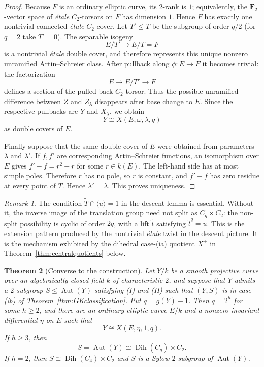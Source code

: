 \documentclass[11pt]{article}
\newtheorem{theorem}{Theorem}[section]
\theoremstyle{remark}
\newtheorem{remark}[theorem]{Remark}
\newcommand{\Aut}{\operatorname{Aut}}
\newcommand{\Dih}{\operatorname{Dih}}
\begin{document}
\begin{proof}
Because $F$ is an ordinary elliptic curve, its $2$-rank is $1$;
equivalently, the $\mathbf F_2$-vector space of \emph{\'etale} $C_2$-torsors on
$F$ has dimension $1$.  Hence $F$ has exactly one nontrivial connected
\emph{\'etale} $C_2$-cover.  Let
$T'\le T$ be the subgroup of order $q/2$ (for $q=2$ take $T'=0$).  The
separable isogeny
\[
        E/T'\longrightarrow E/T=F
\]
is a nontrivial \emph{\'etale} double cover, and therefore represents this unique
nonzero unramified Artin--Schreier class.  After pullback along
$\phi:E\to F$ it becomes trivial: the factorization
\[
        E\longrightarrow E/T'\longrightarrow F
\]
defines a section of the pulled-back $C_2$-torsor.  Thus the possible
unramified difference between $Z$ and $Z_\lambda$ disappears after base
change to $E$.  Since the respective pullbacks are $Y$ and $X_\lambda$,
we obtain
\[
        Y\cong X(E,\omega,\lambda,q)
\]
as double covers of $E$.

Finally suppose that the same double cover of $E$ were obtained from
parameters $\lambda$ and $\lambda'$.  If $f,f'$ are corresponding
Artin--Schreier functions, an isomorphism over $E$ gives
$f'-f=r^2+r$ for some $r\in k(E)$.  The left-hand side has at most
simple poles.  Therefore $r$ has no pole, so $r$ is constant, and
$f'-f$ has zero residue at every point of $T$.  Hence
$\lambda'=\lambda$.  This proves uniqueness.
\end{proof}

\begin{remark}\label{rem:descent-sharp}
The condition
$\widetilde T\cap\langle u\rangle=1$ in the descent lemma is essential.
Without it, the inverse image of the translation group need not split as
$C_q\times C_2$: the non-split possibility is cyclic of order $2q$, with
a lift $\widetilde t$ satisfying $\widetilde t^{q}=u$.  This is the
extension pattern produced by the nontrivial \emph{\'etale} twist in the
descent picture.  It is the mechanism exhibited by the dihedral
case-\textup{(ia)} quotient $X^+$ in
Theorem~\ref{thm:centralquotients} below.
\end{remark}

\begin{theorem}[Converse to the construction]\label{thm:converse}
Let $Y/k$ be a smooth projective curve over an algebraically closed field
$k$ of characteristic $2$, and suppose that $Y$ admits a $2$-subgroup
$S\leq\Aut(Y)$ satisfying \textup{(I)} and \textup{(II)} such that
$(Y,S)$ is in case \textup{(ib)} of
Theorem~\ref{thm:GKclassification}.  Put $q=g(Y)-1$.  Then
$q=2^h$ for some $h\ge2$, and there are an ordinary elliptic curve $E/k$
and a nonzero invariant differential $\eta$ on $E$ such that
\[
        Y\cong X(E,\eta,1,q).
\]
If $h\ge3$, then
\[
        S=\Aut(Y)\cong \Dih(C_q)\times C_2.
\]
If $h=2$, then $S\cong\Dih(C_4)\times C_2$ and $S$ is a Sylow
$2$-subgroup of $\Aut(Y)$.
\end{theorem}
\end{document}
